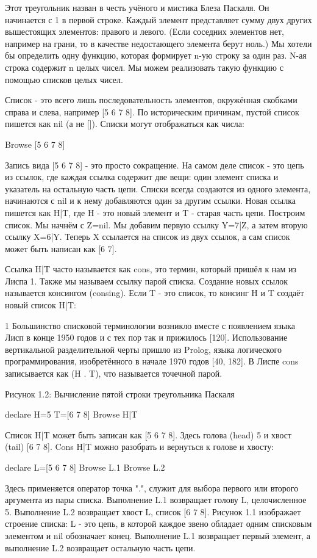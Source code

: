 Этот треугольник назван в честь учёного и мистика Блеза Паскаля. Он начинается с 1 в первой строке. Каждый элемент представляет сумму двух других вышестоящих элементов: правого и левого. (Если соседних элементов нет, например на грани, то в качестве недостающего элемента берут ноль.) Мы хотели бы определить одну функцию, которая формирует n-ую строку за один раз. N-ая строка содержит n целых чисел. Мы можем реализовать такую функцию с помощью списков целых чисел.

Список - это всего лишь последовательность элементов, окружённая скобками справа и слева, например [5 6 7 8]. По историческим причинам, пустой список пишется как nil (а не []). Списки могут отображаться как числа:

{Browse [5 6 7 8]}

Запись вида [5 6 7 8] - это просто сокращение. На самом деле список - это цепь из ссылок, где каждая ссылка содержит две вещи: один элемент списка и указатель на остальную часть цепи. Списки всегда создаются из одного элемента, начинаются с nil и к нему добавляются один за другим ссылки. Новая ссылка пишется как H|T, где H - это новый элемент и T - старая часть цепи. Построим список. Мы начнём с Z=nil. Мы добавим первую ссылку Y=7|Z, а затем вторую ссылку X=6|Y. Теперь X ссылается на список из двух ссылок, а сам список может быть написан как [6 7].

Ссылка H|T часто называется как cons, это термин, который пришёл к нам из Лиспа 1. Также мы называем ссылку парой списка. Создание новых ссылок называется консингом (consing). Если T - это список, то консинг H и T создаёт новый список H|T:

1 Большинство списковой терминологии возникло вместе с появлением языка Лисп в конце 1950 годов и с тех пор так и прижилось [120]. Использование вертикальной разделительной черты пришло из Prolog, языка логического программирования, изобретённого в начале 1970 годов [40, 182]. В Лиспе cons записывается как (H . T), что называется точечной парой.

Рисунок 1.2: Вычисление пятой строки треугольника Паскаля

declare
H=5
T=[6 7 8]
{Browse H|T}

Список H|T может быть записан как [5 6 7 8]. Здесь голова (head) 5 и хвост (tail) [6 7 8]. Cons H|T можно разобрать и вернуться к голове и хвосту:

declare
L=[5 6 7 8]
{Browse L.1}
{Browse L.2}

Здесь применяется оператор точка ".", служит для выбора первого или второго аргумента из пары списка. Выполнение L.1 возвращает голову L, целочисленное 5. Выполнение L.2 возвращает хвост L, список [6 7 8]. Рисунок 1.1 изображает строение списка: L - это цепь, в которой каждое звено обладает одним списковым элементом и nil обозначает конец. Выполнение L.1 возвращает первый элемент, а выполнение L.2 возвращает остальную часть цепи.

